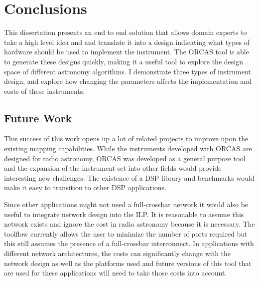 \chapter{Conclusions}
\label{chap:Conclusions}


This dissertation presents an end to end solution that allows domain experts to take a high level idea and and translate it into a design indicating what types of hardware should be used to implement the instrument. 
The ORCAS tool is able to generate these designs quickly, making it a useful tool to explore the design space of different astronomy algorithms.
I demonstrate three types of instrument design, and explore how changing the parameters affects the implementation and costs of these instruments.



\section{Future Work}
This success of this work opens up a lot of related projects to improve upon the existing mapping capabilities.
While the instruments developed with ORCAS are designed for radio astronomy, ORCAS was developed as a general purpose tool and the expansion of the instrument set into other fields would provide interesting new challenges.
The existence of a DSP library and benchmarks would make it easy to transition to other DSP applications.

Since other applications might not need a full-crossbar network it would also be useful to integrate network design into the ILP.
It is reasonable to assume this network exists and ignore the cost in radio astronomy because it is necessary.
The toolflow currently allows the user to minimize the number of ports required but this still assumes the presence of a full-crossbar interconnect.
In applications with different network architectures, the costs can significantly change with the network design as well as the platforms used and future versions of this tool that are used for these applications will need to take those costs into account.

